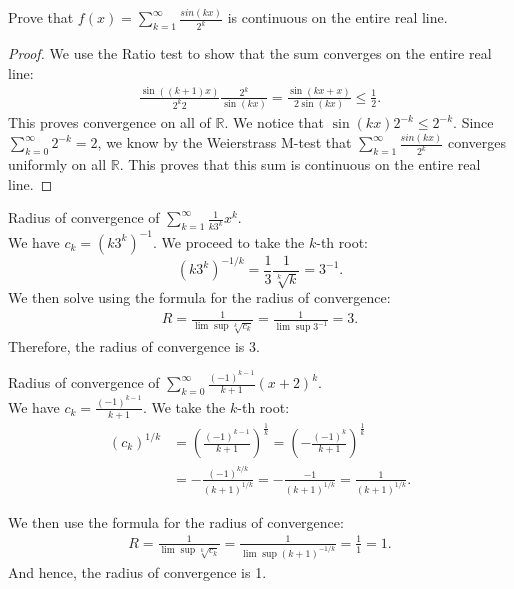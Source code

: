 \documentclass[12pt]{book}
\newcommand{\R}{\mathbb{R}}
\newenvironment{exercise}[2][Exercise]{\begin{trivlist}
\item[\hskip \labelsep {\bfseries #1}\hskip \labelsep {\bfseries #2.}]}{\end{trivlist}}
\begin{document}
\begin{exercise}{6.4.2}
Prove that $f(x) = \sum_{k=1}^\infty \frac{sin (kx)}{2^k} $ is continuous on the entire real line.

\begin{proof}
    We use the Ratio test to show that the sum converges on the entire real line:
        \begin{align*}
        \frac{\sin\left( (k+1)x \right)}{2^k 2} \frac{2^k}{\sin(kx)} = \frac{\sin \left(kx+x\right)}{2 \sin(kx)} \leq \frac{1}{2}.
        \end{align*}
    This proves convergence on all of $\R$. We notice that $\sin(kx)2^{-k} \leq 2^{-k}$. Since $\sum_{k=0}^\infty 2^{-k} = 2$, we know by the Weierstrass M-test that $\sum_{k=1}^\infty \frac{sin (kx)}{2^k}$ converges uniformly on all $\R$. This proves that this sum is continuous on the entire real line.
\end{proof}
\end{exercise}



\begin{exercise}{6.4.4}
Radius of convergence of $\sum_{k=1}^\infty \frac{1}{k 3^k}x^k$. \\

We have $c_k = (k 3^k)^{-1}$. We proceed to take the $k$-th root: 
    \[ (k 3^k)^{-1/k} = \frac{1}{3} \frac{1}{\sqrt[k]{k}} = 3^{-1}. \]
We then solve using the formula for the radius of convergence:
    \begin{align*}
    R = \frac{1}{\lim \sup \sqrt[k]{c_k}} = \frac{1}{\lim \sup 3^{-1}} = 3.
    \end{align*}
 Therefore, the radius of convergence is 3.
\end{exercise}



\begin{exercise}{6.4.5}
Radius of convergence of $\sum_{k=0}^\infty \frac{(-1)^{k-1}}{k+1} (x+2)^k$.  \\

We have $c_k= \frac{(-1)^{k-1}}{k+1}$. We take the $k$-th root:
    \begin{align*}
    (c_k)^{1/k} &=  \left( \frac{(-1)^{k-1}}{k+1} \right)^{\frac{1}{k}} = \left(- \frac{(-1)^k}{k+1} \right)^{\frac{1}{k}} \\
                &= - \frac{(-1)^{k/k}}{\left(k+1\right)^{1/k}} = - \frac{-1}{\left(k+1\right)^{1/k}} = \frac{1}{\left(k+1\right)^{1/k}}.
    \end{align*}
    
    We then use the formula for the radius of convergence:
    \begin{align*}
    R = \frac{1}{\lim \sup \sqrt[k]{c_k}} = \frac{1}{\lim \sup \left(k+1\right)^{-1/k}} = \frac{1}{1} = 1.
    \end{align*}
    And hence, the radius of convergence is 1.
\end{exercise}
\end{document}
